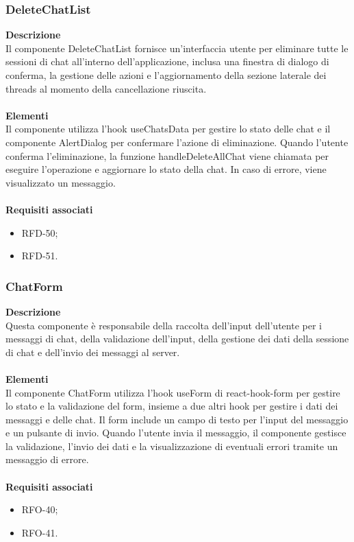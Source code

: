 \subsubsection{DeleteChatList}
\textbf{Descrizione}\\
Il componente DeleteChatList fornisce un'interfaccia utente per eliminare tutte le sessioni di chat all'interno dell'applicazione, inclusa una finestra di dialogo di conferma, la gestione delle azioni e l'aggiornamento della sezione laterale dei threads al momento della cancellazione riuscita.\\ \\
\textbf{Elementi}\\
Il componente utilizza l'hook useChatsData per gestire lo stato delle chat e il componente AlertDialog per confermare l'azione di eliminazione. Quando l'utente conferma l'eliminazione, la funzione handleDeleteAllChat viene chiamata per eseguire l'operazione e aggiornare lo stato della chat. In caso di errore, viene visualizzato un messaggio.\\ \\
\textbf{Requisiti associati}
\begin{itemize}[itemsep=-4pt]
    \item RFD-50;
    \item RFD-51.
\end{itemize}

\subsubsection{ChatForm}
\textbf{Descrizione}\\
Questa componente è responsabile della raccolta dell'input dell'utente per i messaggi di chat, della validazione dell'input, della gestione dei dati della sessione di chat e dell'invio dei messaggi al server.\\ \\
\textbf{Elementi}\\
Il componente ChatForm utilizza l'hook useForm di react-hook-form per gestire lo stato e la validazione del form, insieme a due altri hook per gestire i dati dei messaggi e delle chat. Il form include un campo di testo per l'input del messaggio e un pulsante di invio. Quando l'utente invia il messaggio, il componente gestisce la validazione, l'invio dei dati e la visualizzazione di eventuali errori tramite un messaggio di errore. \\ \\
\textbf{Requisiti associati}
\begin{itemize}[itemsep=-4pt]
    \item RFO-40;
    \item RFO-41.
\end{itemize}


